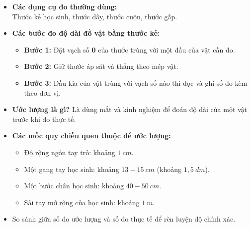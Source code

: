 \documentclass[10pt,a4paper]{article}
\begin{document}
\noindent
\begin{minipage}[t]{0.49\textwidth}\vspace{0pt}
\begin{tcolorbox}[
  enhanced,
  colback=violet!4!white,
  colframe=violet!75!black,
  arc=2mm, boxrule=0.8pt,
  left=2mm, right=2mm, top=1.8mm, bottom=1.8mm,
  title={\footnotesize\bfseries\color{white}\faKey\ 1. Dụng cụ đo và cách sử dụng thước}
]
{\footnotesize
\begin{itemize}\setlength{\itemsep}{1pt}\setlength{\leftskip}{-2.5mm}
  \item \textbf{Các dụng cụ đo thường dùng:}\\
  Thước kẻ học sinh, thước dây, thước cuộn, thước gấp.
  \item \textbf{Các bước đo độ dài đồ vật bằng thước kẻ:}
  \begin{itemize}\setlength{\itemsep}{0.5pt}\setlength{\leftskip}{-2mm}
    \item \textbf{Bước 1:} Đặt vạch số \textbf{0} của thước trùng với một đầu của vật cần đo.
    \item \textbf{Bước 2:} Giữ thước áp sát và thẳng theo mép vật.
    \item \textbf{Bước 3:} Đầu kia của vật trùng với vạch số nào thì đọc và ghi số đo kèm theo đơn vị.
  \end{itemize}
\end{itemize}
}
\end{tcolorbox}
\end{minipage}
\hfill
\begin{minipage}[t]{0.49\textwidth}\vspace{0pt}
\begin{tcolorbox}[
  enhanced,
  colback=teal!4!white,
  colframe=teal!75!black,
  arc=2mm, boxrule=0.8pt,
  left=2mm, right=2mm, top=1.8mm, bottom=1.8mm,
  title={\footnotesize\bfseries\color{white}\faSliders\ 2. Kĩ năng ước lượng độ dài}
]
{\footnotesize
\begin{itemize}\setlength{\itemsep}{1pt}\setlength{\leftskip}{-2.5mm}
  \item \textbf{Ước lượng là gì?} Là dùng mắt và kinh nghiệm để đoán độ dài của một vật trước khi đo thực tế.
  \item \textbf{Các mốc quy chiếu quen thuộc để ước lượng:}
  \begin{itemize}\setlength{\itemsep}{0.5pt}\setlength{\leftskip}{-2mm}
    \item Độ rộng ngón tay trỏ: khoảng $1\ cm$.
    \item Một gang tay học sinh: khoảng $13 - 15\ cm$ (khoảng $1{,}5\ dm$).
    \item Một bước chân học sinh: khoảng $40 - 50\ cm$.
    \item Sải tay mở rộng của học sinh: khoảng $1\ m$.
  \end{itemize}
  \item So sánh giữa số đo ước lượng và số đo thực tế để rèn luyện độ chính xác.
\end{itemize}
}
\end{tcolorbox}
\end{minipage}
\end{document}
